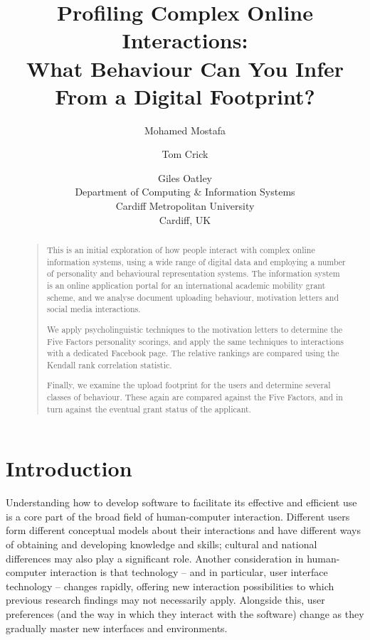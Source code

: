 \documentclass[letterpaper]{article}
\begin{document}
\title{Profiling Complex Online Interactions:\\What Behaviour Can You Infer From a Digital Footprint?}
\author{Mohamed Mostafa \and Tom Crick \and Giles Oatley\\
Department of Computing \& Information Systems\\
Cardiff Metropolitan University\\
Cardiff, UK
}

\maketitle

\begin{abstract}
\begin{quote}
This is an initial exploration of how people interact with complex
online information systems, using a wide range of digital data and
employing a number of personality and behavioural representation
systems. The information system is an online application portal for an
international academic mobility grant scheme, and we analyse document
uploading behaviour, motivation letters and social media
interactions.

We apply psycholinguistic techniques to the motivation letters to
determine the Five Factors personality scorings, and apply the same
techniques to interactions with a dedicated Facebook page. The
relative rankings are compared using the Kendall rank correlation
statistic.

Finally, we examine the upload footprint for the users and determine
several classes of behaviour. These again are compared against the
Five Factors, and in turn against the eventual grant status of the
applicant.
\end{quote}
\end{abstract}


\section{Introduction}

Understanding how to develop software to facilitate its effective and
efficient use is a core part of the broad field of human-computer
interaction. Different users form different conceptual models about
their interactions and have different ways of obtaining and developing
knowledge and skills; cultural and national differences may also play
a significant role. Another consideration in human-computer
interaction is that technology -- and in particular, user interface
technology -- changes rapidly, offering new interaction possibilities
to which previous research findings may not necessarily
apply. Alongside this, user preferences (and the way in which they
interact with the software) change as they gradually master new
interfaces and environments.
\end{document}
